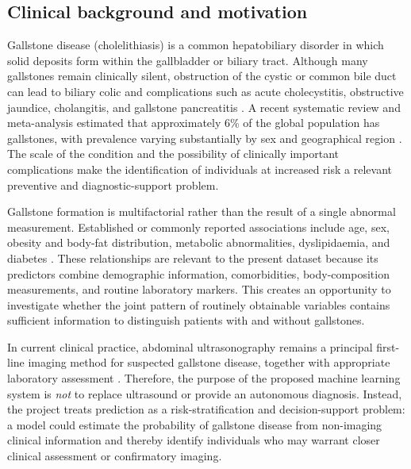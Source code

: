 \subsection{Clinical background and motivation}

Gallstone disease (cholelithiasis) is a common hepatobiliary disorder in which solid deposits form within the gallbladder or biliary tract. Although many gallstones remain clinically silent, obstruction of the cystic or common bile duct can lead to biliary colic and complications such as acute cholecystitis, obstructive jaundice, cholangitis, and gallstone pancreatitis \cite{lammert2016gallstones,fujita2023guidelines}. A recent systematic review and meta-analysis estimated that approximately 6\% of the global population has gallstones, with prevalence varying substantially by sex and geographical region \cite{wang2024global}. The scale of the condition and the possibility of clinically important complications make the identification of individuals at increased risk a relevant preventive and diagnostic-support problem.

Gallstone formation is multifactorial rather than the result of a single abnormal measurement. Established or commonly reported associations include age, sex, obesity and body-fat distribution, metabolic abnormalities, dyslipidaemia, and diabetes \cite{lammert2016gallstones}. These relationships are relevant to the present dataset because its predictors combine demographic information, comorbidities, body-composition measurements, and routine laboratory markers. This creates an opportunity to investigate whether the joint pattern of routinely obtainable variables contains sufficient information to distinguish patients with and without gallstones.

In current clinical practice, abdominal ultrasonography remains a principal first-line imaging method for suspected gallstone disease, together with appropriate laboratory assessment \cite{easl2016guidelines,nice2014gallstone,fujita2023guidelines,gutt2020treatment}. Therefore, the purpose of the proposed machine learning system is \emph{not} to replace ultrasound or provide an autonomous diagnosis. Instead, the project treats prediction as a risk-stratification and decision-support problem: a model could estimate the probability of gallstone disease from non-imaging clinical information and thereby identify individuals who may warrant closer clinical assessment or confirmatory imaging.


